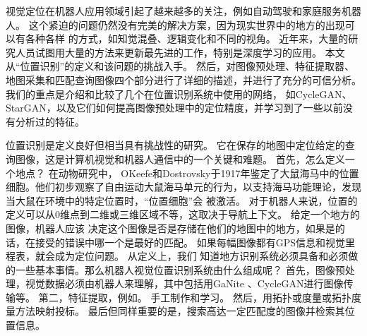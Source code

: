 视觉定位在机器人应用领域引起了越来越多的关注，例如自动驾驶和家庭服务机器人。 这个紧迫的问题仍然没有完美的解决方案，因为现实世界中的地方的出现可以有各种各样
的方式，如知觉混叠、逻辑变化和不同的视角。 近年来，大量的研究人员试图用大量的方法来更新最先进的工作，特别是深度学习的应用。 本文从“位置识别”的定义和该问题的挑战入手。
然后，对图像预处理、特征提取器、地图采集和匹配查询图像四个部分进行了详细的描述，并进行了充分的可信分析。 我们的重点是介绍和比较了几个在位置识别系统中使用的网络，
如CycleGAN、StarGAN，以及它们如何提高图像预处理中的定位精度，并学习到了一些以前没有分析过的特征。

位置识别是定义良好但相当具有挑战性的研究。 它在保存的地图中定位给定的查询图像，这是计算机视觉和机器人通信中的一个关键和难题。 首先，怎么定义一个地点？ 在动物研究中，
OKeefe和Dostrovsky于1917年鉴定了大鼠海马中的位置细胞。他们初步观察了自由运动大鼠海马单元的行为，以支持海马功能理论，发现当大鼠在环境中的特定位置时，“位置细胞”会
被激活。%
对于机器人来说，位置的定义可以从0维点到二维或三维区域不等，这取决于导航上下文\cite{lowry2016visual}\cite{kuipers2000spatial}。 给定一个地方的图像，机器人应该
决定这个图像是否是存储在他们的地图中的地方，如果是的话，在接受的错误中哪一个是最好的匹配。 如果每幅图像都有GPS信息和视觉里程表，就会成为定位问题。 从定义上，我们
知道地方识别系统必须具备和必须做的一些基本事情。那么机器人视觉位置识别系统由什么组成呢？ 首先，图像预处理，视觉数据必须由机器人来理解，其中包括用GaNite
\cite{latif2017addressing}、CycleGAN\cite{zhu2017unpaired}进行图像传输等。 第二，特征提取，例如。 手工制作和学习。 然后，用拓扑或度量或拓扑度量方法映射投标。
最后但同样重要的是，搜索高达一定匹配度的图像并检索其位置信息。

